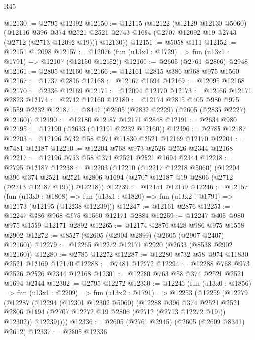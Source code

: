 \begin{lexlean}{R45}
\begin{coremodule}
@12130 := @2795 @12092
@12150 := @12115
    (@12122
      (@12129 @12130 @5060)
      (@12116
        @396
        @374
        @2521
        @2521
        @2743
        @1694
        (@2707 @12092 @19 @2743 (@2712 (@2713 @12092 @19)))
        @12130))
@12151 := @5058 @111
@12152 := @12151 @12098
@12157 := @12076 (fun (u13x0 : @1729) => fun (u13x1 : @1791) => @12107 (@12150 @12152))
@12160 := @2605 (@2761 @2806) @2948
@12161 := @2805 @12160
@12166 := @12161 @2815 @386 @968 @975 @1560
@12167 := @1737 @2806
@12168 := @12167 @1694
@12169 := @12095 @12168
@12170 := @2336 @12169
@12171 := @12094 @12170
@12173 := @12166 @12171 @2823
@12174 := @2742 @12160
@12180 := @12174 @2815 @405 @980 @975 @1559 @2232
@12187 := @8447 (@2605 (@2832 @2229) (@2605 (@2835 @2227) @12160))
@12190 := @12180 @12187 @12171 @2848
@12191 := @2634 @980
@12195 := @12190 (@2633 (@12191 @2232 @12160))
@12196 := @2785 @12187
@12203 := @12196 @732 @58 @974 @11830 @2521 @12169 @12170
@12204 := @7481 @12187
@12210 := @12204 @768 @973 @2526 @2526 @2344 @12168
@12217 := @12196 @763 @58 @374 @2521 @2521 @1694 @2344
@12218 := @2795 @12187
@12238 := @12203
    (@12210
      (@12217 @12218 @5060)
      (@12204
        @396
        @374
        @2521
        @2521
        @2806
        @1694
        (@2707 @12187 @19 @2806 (@2712 (@2713 @12187 @19)))
        @12218))
@12239 := @12151 @12169
@12246 := @12157
    (fun (u13x0 : @1808) =>
    fun (u13x1 : @1820) => fun (u13x2 : @1791) => @12173 (@12195 (@12238 @12239)))
@12247 := @12161 @2876
@12253 := @12247 @386 @968 @975 @1560 @12171 @2884
@12259 := @12247 @405 @980 @975 @1559 @12171 @2892
@12265 := @12174 @2876 @428 @986 @975 @1558 @2902
@12272 := @8527 (@2605 (@2904 @2899) (@2605 (@2907 @2407) @12160))
@12279 := @12265 @12272 @12171 @2920 (@2633 (@8538 @2902 @12160))
@12280 := @2785 @12272
@12287 := @12280 @732 @58 @974 @11830 @2521 @12169 @12170
@12288 := @7481 @12272
@12294 := @12288 @768 @973 @2526 @2526 @2344 @12168
@12301 := @12280 @763 @58 @374 @2521 @2521 @1694 @2344
@12302 := @2795 @12272
@12330 := @12246
    (fun (u13x0 : @1856) =>
    fun (u13x1 : @2209) =>
    fun (u13x2 : @1791) =>
    @12253
      (@12259
        (@12279
          (@12287
            (@12294
              (@12301 @12302 @5060)
              (@12288
                @396
                @374
                @2521
                @2521
                @2806
                @1694
                (@2707 @12272 @19 @2806 (@2712 (@2713 @12272 @19)))
                @12302))
            @12239))))
@12336 := @2605 (@2761 @2945) (@2605 (@2609 @8341) @2612)
@12337 := @2805 @12336

\end{coremodule}
\end{lexlean}

